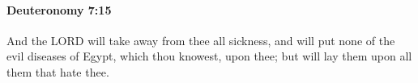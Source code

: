 
		\paragraph{Deuteronomy 7:15} %
			\label{DEUTERONOMY-7-15}

			And the LORD will take away from thee all sickness, and will put none of the evil diseases of Egypt, which thou knowest, upon thee; but will lay them upon all them that hate thee.


